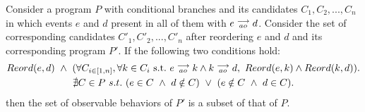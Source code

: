         \begin{corollary}
            \label{ReordCond}
            Consider a program $P$ with conditional branches and its candidates $C_1, C_2, ... , C_n$ in which events $e$ and $d$ present in all of them with $e\stackrel{\longrightarrow}{_{ao}}d$. Consider the set of corresponding candidates $C'_1, C'_2, ... , C'_n$ after reordering $e$ and $d$ and its corresponding program $P'$. If the following two conditions hold:
            \begin{gather*}
                Reord(e,d) \ \wedge \ 
                ( \forall C_{i \in [1,n]}, \forall k \in C_i \ \text{s.t.} \ \reln{e}{ao}{k} \wedge \reln{k}{ao}{d}, \    
                Reord(e,k) \wedge Reord(k,d) ). \\
                \nexists C \in P \ s.t. \ 
                    (e \in C \ \wedge \ d \notin C) \ \vee \ 
                    (e \notin C \ \wedge \ d \in C). 
            \end{gather*}
            then the set of observable behaviors of $P'$ is a subset of that of $P$. 
        \end{corollary}

